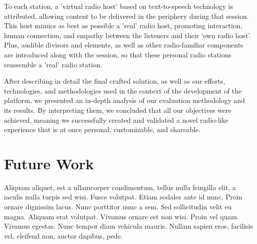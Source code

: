 To each station, a 'virtual radio host' based on text-to-speech technology is attributed, allowing content to be delivered in the periphery during that session. This host mimics as best as possible a 'real' radio host, promoting interaction, human connection, and empathy between the listeners and their ‘own radio host’. Plus, audible divisors and elements, as well as other radio-familiar components are introduced along with the session, so that these personal radio stations reassemble a 'real' radio station.

After describing in detail the final crafted solution, as well as our efforts, technologies, and methodologies used in the context of the development of the platform, we presented an in-depth analysis of our evaluation methodology and its results. By interpreting them, we concluded that all our objectives were achieved, meaning we successfully created and validated a novel radio-like experience that is at once personal, customizable, and shareable.

\section{Future Work}
Aliquam aliquet, est a ullamcorper condimentum, tellus nulla fringilla elit, a iaculis nulla turpis sed wisi. Fusce volutpat. Etiam sodales ante id nunc. Proin ornare dignissim lacus. Nunc porttitor nunc a sem. Sed sollicitudin velit eu magna. Aliquam erat volutpat. Vivamus ornare est non wisi. Proin vel quam. Vivamus egestas. Nunc tempor diam vehicula mauris. Nullam sapien eros, facilisis vel, eleifend non, auctor dapibus, pede.